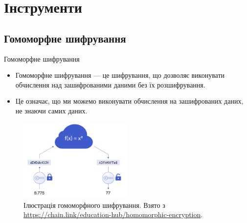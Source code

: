 \documentclass{zkdl-presentation-template}
\begin{document}
    \section[Інструменти]{Інструменти}

    \subsection{Гомоморфне шифрування}

    \begin{frame}{Гомоморфне шифрування}
        \begin{itemize}
            \item Гомоморфне шифрування --- це шифрування, що дозволяє
            виконувати обчислення над зашифрованими даними без їх
            розшифрування.
            \item Це означає, що ми можемо виконувати обчислення на
            зашифрованих даних, не знаючи самих даних.
        \end{itemize}
        
        \begin{figure}
            \centering
            \includegraphics[width=0.5\textwidth]{images/fhe.png}
            \caption{Ілюстрація гомоморфного шифрування. Взято з
            \url{https://chain.link/education-hub/homomorphic-encryption}.}
            \label{fig:fhe}
        \end{figure}
    \end{frame}
\end{document}
